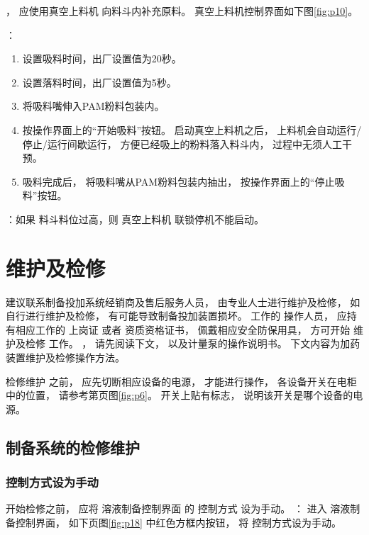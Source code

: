 \documentclass[UTF8,a4paper,12pt,titlepage]{ctexart}
\begin{document}
         

         ，
         应使用真空上料机
         向料斗内补充原料。
        真空上料机控制界面如下图\ref{fig:p10}。

         


         ：
         \begin{enumerate}
            \item 设置吸料时间，出厂设置值为20秒。
            \item 设置落料时间，出厂设置值为5秒。
            \item 将吸料嘴伸入PAM粉料包装内。
            \item 按操作界面上的“开始吸料”按钮。
            启动真空上料机之后，
            上料机会自动运行/停止/运行间歇运行，
            方便已经吸上的粉料落入料斗内，
            过程中无须人工干预。
            \item 吸料完成后，
                将吸料嘴从PAM粉料包装内抽出，
             按操作界面上的“停止吸料”按钮。
         \end{enumerate}

         ：如果 料斗料位过高，则 真空上料机 联锁停机不能启动。
         

          \newpage

\section{维护及检修}
   建议联系制备投加系统经销商及售后服务人员，
   由专业人士进行维护及检修，
   如自行进行维护及检修，
   有可能导致制备投加装置损坏。
    工作的 操作人员，
   应持有相应工作的 上岗证 或者 资质资格证书，
   佩戴相应安全防保用具，
   方可开始 维护及检修 工作。
   ，
   请先阅读下文，
   以及计量泵的操作说明书。
   下文内容为加药装置维护及检修操作方法。

     检修维护 之前，
    应先切断相应设备的电源，
    才能进行操作，
    各设备开关在电柜中的位置， 
    请参考第\pageref{sec:power-on}页图\ref{fig:p6}。
    开关上贴有标志，
    说明该开关是哪个设备的电源。

   \subsection{制备系统的检修维护}

        \subsubsection{控制方式设为手动} 
            开始检修之前，
            应将 溶液制备控制界面 的 控制方式 设为手动。
            ：
            进入 溶液制备控制界面，
            如下页图\ref{fig:p18} 中红色方框内按钮，
            将 控制方式设为手动。
\end{document}
